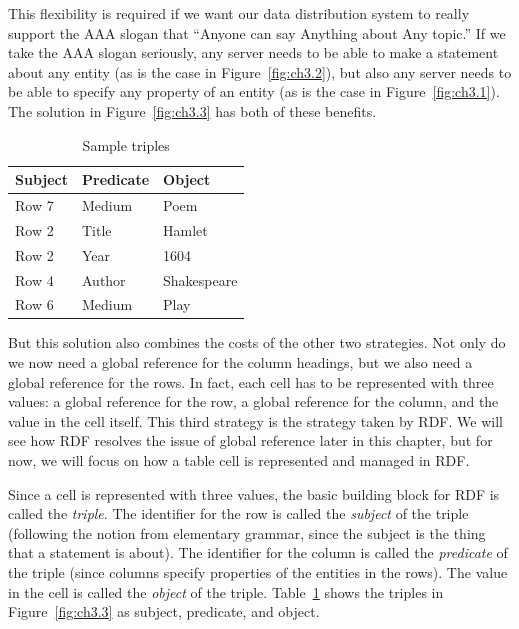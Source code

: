 This flexibility is required if we want our data distribution system to
really support the AAA slogan that ``Anyone can say Anything about Any topic.'' If we take the AAA
slogan seriously, any server needs to be able to make a statement about
any entity (as is the case in Figure~\ref{fig:ch3.2}), but also any server needs to
be able to specify any property of an entity (as is the case in Figure~\ref{fig:ch3.1}). The solution in Figure~\ref{fig:ch3.3} has both of these benefits.


\begin{table}[h]
\centering
\begin{tabular}{||l l l||} 
 \hline
Subject&Predicate&Object \\ [0.5ex] 
 \hline\hline
Row 7&Medium&Poem \\
Row 2&Title&Hamlet \\
Row 2&Year&1604\\
Row 4&Author&Shakespeare\\
Row 6&Medium&Play\\

\hline
\end{tabular}
\caption{Sample triples}
\label{tab:ch3.2}
\end{table}





But this solution also combines the costs of the other two strategies.
Not only do we now need a global reference for the column headings, but
we also need a global reference for the rows. In fact, each cell has to
be represented with three values: a global reference for the row, a
global reference for the column, and the value in the cell itself. This
third strategy is the strategy taken by RDF. We will see how RDF
resolves the issue of global reference later in this chapter, but for
now, we will focus on how a table cell is represented and managed in
RDF.

Since a cell is represented with three values, the basic building block
for RDF is called the \emph{triple}. The identifier for the row is called the
\emph{subject} of the triple (following the notion from elementary grammar,
since the subject is the thing that a statement is about). The
identifier for the column is called the \emph{predicate} of the triple (since
columns specify properties of the entities in the rows). The value in
the cell is called the \emph{object} of the triple. Table~\ref{tab:ch3.2} shows the triples
in Figure~\ref{fig:ch3.3} as subject, predicate, and object.

